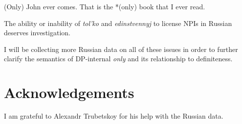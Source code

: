 \documentclass{article}
\begin{document}
\begin{exe}
	\ex *(Only) John ever comes.
	\ex That is the *(only) book that I ever read.
\end{exe}

The ability or inability of \textit{tol'ko} and \textit{edinstvennyj} to license NPIs in Russian deserves investigation.

I will be collecting more Russian data on all of these issues in order to further clarify the semantics of DP-internal \textit{only} and its relationship to definiteness.

\section*{Acknowledgements}
I am grateful to Alexandr Trubetskoy for his help with the Russian data.



\end{document}
